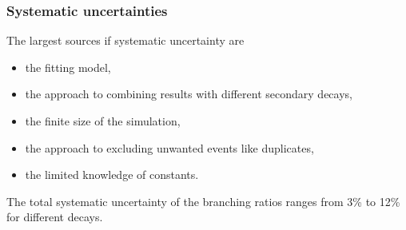 \documentclass[10pt, aspectratio=169]{beamer}
\begin{document}
\begin{frame}[label=systematics]%
  \frametitle{Systematic uncertainties}

  The largest sources if systematic uncertainty are
  \begin{itemize}
    \item the fitting model,
    \item the approach to combining results with different secondary 
      decays,
    \item the finite size of the simulation,
    \item the approach to excluding unwanted events like duplicates,
    \item the limited knowledge of constants.
  \end{itemize}

  \vfill

  The total systematic uncertainty of the branching ratios ranges from 
  3\% to 12\% for different decays.

\end{frame}%
\end{document}
